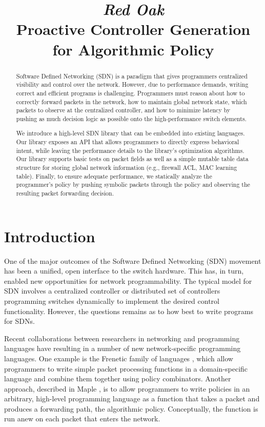\documentclass[preprint]{sigplanconf}
\title{\textit{Red Oak}\\ Proactive Controller Generation for Algorithmic Policy}
\begin{document}
\maketitle


\begin{abstract}
Software Defined Networking (SDN) is a paradigm that gives programmers 
centralized visibility and control over the network. However, due to performance 
demands, writing correct and efficient programs is challenging. Programmers must 
reason about how to correctly forward packets in the network, how to maintain
global network state, which packets to observe at the centralized controller, 
and how to minimize latency by pushing as much decision logic
as possible onto the high-performance switch elements.

We introduce a high-level SDN library that can be embedded into existing languages.
Our library exposes an API that allows programmers to directly express behavioral intent, 
while leaving the performance details to the library's optimization algorithms.
Our library supports basic tests on packet fields as well as a simple mutable table
data structure for storing global network information (e.g., firewall ACL, MAC learning table).
Finally, to ensure adequate performance, 
we statically analyze the programmer's policy by pushing symbolic packets through the policy 
and observing the resulting packet forwarding decision.
\end{abstract}


\section*{Introduction}

One of the major outcomes of the Software Defined Networking (SDN) movement has been a unified, open interface to the switch hardware. This has, in turn, enabled new opportunities for network programmability. The typical model for SDN involves a centralized controller or distributed set of controllers programming switches dynamically to implement the desired control functionality.
However, the questions remains as to how best to write programs for SDNs.

Recent collaborations between researchers in networking and programming languages have resulting in a number of new network-specific programming languages. One example is the Frenetic family of languages \cite{Frenetic}, which allow programmers to write simple packet processing functions in a domain-specific language and combine them together using policy combinators. Another approach, described in Maple \cite{Maple}, is to allow programmers to write policies in an arbitrary, high-level programming language as a function that takes a packet and produces a forwarding path, the algorithmic policy. Conceptually, the function is run anew on each packet that enters the network.
\end{document}
